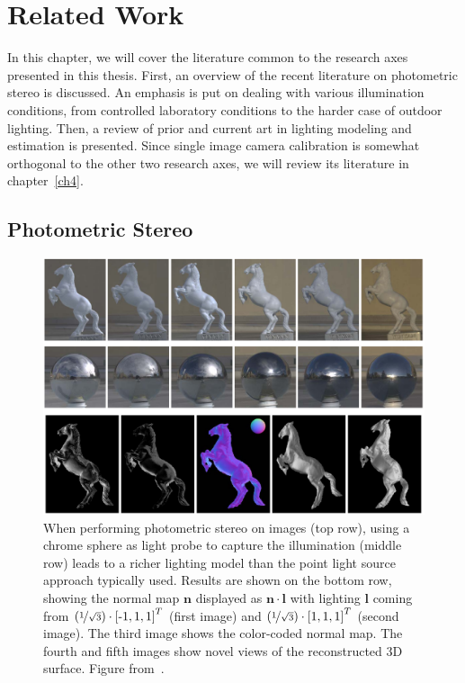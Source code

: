 \chapter{Related Work}
\label{ch:rw}

In this chapter, we will cover the literature common to the research axes presented in this thesis. First, an overview of the recent literature on photometric stereo is discussed. An emphasis is put on dealing with various illumination conditions, from controlled laboratory conditions to the harder case of outdoor lighting. Then, a review of prior and current art in lighting modeling and estimation is presented. Since single image camera calibration is somewhat orthogonal to the other two research axes, we will review its literature in chapter~\ref{ch4}.


\section{Photometric Stereo}


\begin{figure}
\centering
\includegraphics[width=0.96\linewidth]{3rdparty/yu-summary.png}
\caption[State-of-the-art calibrated photometric stereo]{When performing photometric stereo on images (top row), using a chrome sphere as light probe to capture the illumination (middle row) leads to a richer lighting model than the point light source approach typically used. Results are shown on the bottom row, showing the normal map $\mathbf{n}$ displayed as $\mathbf{n}\cdot\mathbf{l}$ with lighting $\mathbf{l}$ coming from $\left(\nicefrac{1}{\sqrt{3}}\right) \cdot \left[\text{-}1, 1, 1\right]^T$ (first image) and $\left( \nicefrac{1}{\sqrt{3}} \right) \cdot \left[1, 1, 1\right]^T$ (second image). The third image shows the color-coded normal map. The fourth and fifth images show novel views of the reconstructed 3D surface. Figure from~\cite{yu-iccp-13}.}
\label{fig:yu_summary}
\end{figure}

